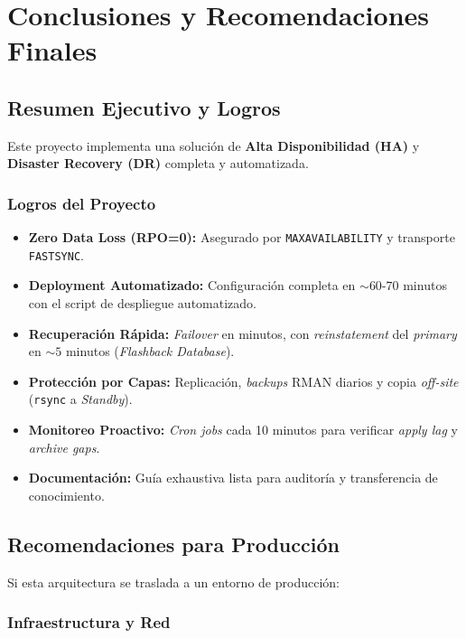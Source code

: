 \documentclass[11pt, a4paper]{report}
\begin{document}
\newpage

\chapter{Conclusiones y Recomendaciones Finales}

\section{Resumen Ejecutivo y Logros}

Este proyecto implementa una solución de \textbf{Alta Disponibilidad (HA)} y \textbf{Disaster Recovery (DR)} completa y automatizada.
\subsection{Logros del Proyecto}
\begin{itemize}
    \item \textbf{Zero Data Loss (RPO=0):} Asegurado por \texttt{MAXAVAILABILITY} y transporte \texttt{FASTSYNC}.
\item \textbf{Deployment Automatizado:} Configuración completa en $\sim 60$-$70$ minutos con el script de despliegue automatizado.
\item \textbf{Recuperación Rápida:} \textit{Failover} en minutos, con \textit{reinstatement} del \textit{primary} en $\sim 5$ minutos (\textit{Flashback Database}).
\item \textbf{Protección por Capas:} Replicación, \textit{backups} RMAN diarios y copia \textit{off-site} (\texttt{rsync} a \textit{Standby}).
\item \textbf{Monitoreo Proactivo:} \textit{Cron jobs} cada 10 minutos para verificar \textit{apply lag} y \textit{archive gaps}.
\item \textbf{Documentación:} Guía exhaustiva lista para auditoría y transferencia de conocimiento.
\end{itemize}

\section{Recomendaciones para Producción}

Si esta arquitectura se traslada a un entorno de producción:

\subsection{Infraestructura y Red}
\end{document}
